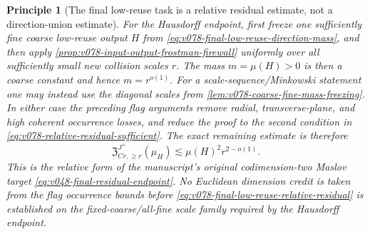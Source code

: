 \documentclass[10pt]{article}
\newtheorem{principle}[theorem]{Principle}
\begin{document}
\begin{principle}[The final low-reuse task is a relative residual estimate, not a direction-union estimate]
\label{pr:v078-final-relative-residual-task}
For the Hausdorff endpoint, first freeze one sufficiently fine coarse low-reuse output \(H\) from
\eqref{eq:v078-final-low-reuse-direction-mass}, and then apply
\cref{prop:v078-input-output-frostman-firewall} uniformly over all sufficiently small new collision
scales \(r\).  The mass \(m=\mu(H)>0\) is then a coarse constant and hence \(m=r^{o(1)}\).  For a
scale-sequence/Minkowski statement one may instead use the diagonal scales from
\cref{lem:v078-coarse-fine-mass-freezing}.  In either case the preceding flag arguments remove
radial, transverse-plane, and high coherent occurrence losses, and reduce the proof to the second condition in \eqref{eq:v078-relative-residual-sufficient}.  The exact remaining estimate is
therefore
\begin{equation}
\label{eq:v078-final-low-reuse-relative-residual}
\boxed{
\mathfrak Z_{Cr,\ge r}^{J^+}(\mu_H)
\lesssim
\mu(H)^2r^{2-o(1)}.
}
\end{equation}
This is the relative form of the manuscript's original codimension-two Maslov target
\eqref{eq:v048-final-residual-endpoint}.  No Euclidean dimension credit is taken from the flag
occurrence bounds before \eqref{eq:v078-final-low-reuse-relative-residual} is established on the
fixed-coarse/all-fine scale family required by the Hausdorff endpoint.
\end{principle}
\end{document}
